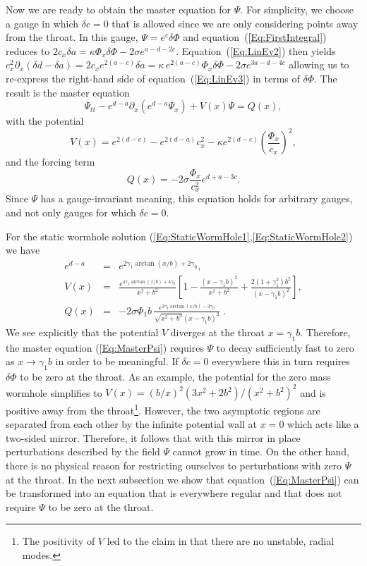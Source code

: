 \documentclass[           %
               showpacs,            %
               preprintnumbers,     %
               aps,                 %
               prd,                 %
               superscriptaddress,      %
               nofootinbib,         %
               tightenlines,        %
               floats,floatfix      %
               ]{revtex4}
\begin{document}
Now we are ready to obtain the master equation for $\Psi$. For
simplicity, we choose a gauge in which $\delta c = 0$ that is allowed
since we are only considering points away from the throat. In this
gauge, $\Psi = e^c\delta\Phi$ and equation~(\ref{Eq:FirstIntegral})
reduces to $2c_x\delta a = \kappa\Phi_x\delta\Phi - 2\sigma
e^{a-d-2c}$. Equation~(\ref{Eq:LinEv2}) then yields
$c_x^2\partial_x(\delta d - \delta a) = 2c_x e^{2(a-c)}\delta a =
\kappa\,e^{2(a-c)}\Phi_x\delta\Phi - 2\sigma e^{3a-d-4c}$ allowing us
to re-express the right-hand side of equation~(\ref{Eq:LinEv3}) in
terms of $\delta\Phi$. The result is the master equation
\begin{equation}
\Psi_{tt} - e^{d-a}\partial_x\left( e^{d-a}\Psi_x \right) + V(x)\Psi = Q(x),
\label{Eq:MasterPsi}
\end{equation}
with the potential
\begin{equation}
V(x) = e^{2(d-c)} - e^{2(d-a)} c_x^2 
 - \kappa e^{2(d-c)}\left( \frac{\Phi_x}{c_x} \right)^2,
\end{equation}
and the forcing term
\begin{equation}
Q(x) = -2\sigma\frac{\Phi_x}{c_x^2} e^{d+a-3c}.
\end{equation}
Since $\Psi$ has a gauge-invariant meaning, this equation holds for
arbitrary gauges, and not only gauges for which $\delta c = 0$.

For the static wormhole solution
(\ref{Eq:StaticWormHole1},\ref{Eq:StaticWormHole2}) we have
\begin{eqnarray}
e^{d-a} &=& e^{2\gamma_1\arctan(x/b) + 2\gamma_0},
\nonumber\\
V(x) &=& \frac{e^{4\gamma_1\arctan(x/b) + 4\gamma_0}}{x^2 + b^2}\left[
 1 - \frac{(x - \gamma_1 b)^2}{x^2 + b^2} 
 + \frac{2(1+\gamma_1^2)b^2}{(x - \gamma_1 b)^2} \right],
\nonumber\\
Q(x) &=& -2\sigma\Phi_1 b\,\frac{e^{3\gamma_1\arctan(x/b)-3\gamma_0}}
  {\sqrt{x^2+b^2}(x - \gamma_1 b)^2}\; .
\nonumber
\end{eqnarray}
We see explicitly that the potential $V$ diverges at the throat $x =
\gamma_1 b$. Therefore, the master equation (\ref{Eq:MasterPsi})
requires $\Psi$ to decay sufficiently fast to zero as $x\to \gamma_1
b$ in order to be meaningful. If $\delta c = 0$ everywhere this in
turn requires $\delta\Phi$ to be zero at the throat. As an example,
the potential for the zero mass wormhole simplifies to $V(x) =
(b/x)^2 (3x^2 + 2b^2)/(x^2 + b^2)^2$ and is positive away from the
throat\footnote{The positivity of $V$ led to the claim in \cite{cA02}
that there are no unstable, radial modes.}. However, the two
asymptotic regions are separated from each other by the infinite
potential wall at $x=0$ which acts like a two-sided mirror. Therefore,
it follows that with this mirror in place perturbations described by
the field $\Psi$ cannot grow in time. On the other hand, there is no
physical reason for restricting ourselves to perturbations with zero
$\Psi$ at the throat. In the next subsection we show that
equation~(\ref{Eq:MasterPsi}) can be transformed into an equation that is
everywhere regular and that does not require $\Psi$ to be zero at the
throat.
\end{document}
